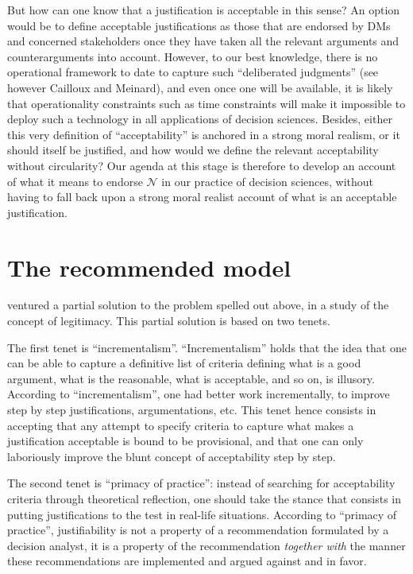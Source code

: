 \documentclass[preprint, french, english, 11pt, authoryear]{elsarticle}%
\newcommand{\adv}{\mathscr{N}}
\begin{document}
But how can one know that a justification is acceptable in this sense? An option would be to define acceptable justifications as those that are endorsed by \acp{DM} and concerned stakeholders once they have taken all the relevant arguments and counterarguments into account. However, to our best knowledge, there is no operational framework to date to capture such ``deliberated judgments'' (see however Cailloux and Meinard), and even once one will be available, it is likely that operationality constraints such as time constraints will make it impossible to deploy such a technology in all applications of decision sciences. Besides, either this very definition of ``acceptability'' is anchored in a strong moral realism, or it should itself be justified, and how would we define the relevant acceptability without circularity? Our agenda at this stage is therefore to develop an account of what it means to endorse $\adv$ in our practice of decision sciences, without having to fall back upon a strong moral realist account of what is an acceptable justification.

\section{The recommended model}
\cite{meinard_what_2017} ventured a partial solution to the problem spelled out above, in a study of the concept of legitimacy. This partial solution is based on two tenets.

The first tenet is ``incrementalism''. ``Incrementalism'' holds that the idea that one can be able to capture a definitive list of criteria defining what is a good argument, what is the reasonable, what is acceptable, and so on, is illusory. According to ``incrementalism'', one had better work incrementally, to improve step by step justifications, argumentations, etc. This tenet hence consists in accepting that any attempt to specify criteria to capture what makes a justification acceptable is bound to be provisional, and that one can only laboriously improve the blunt concept of acceptability step by step.

The second tenet is ``primacy of practice'': instead of searching for acceptability criteria through theoretical reflection, one should take the stance that consists in putting justifications to the test in real-life situations. According to ``primacy of practice'', justifiability is not a property of a recommendation formulated by a decision analyst, it is a property of the recommendation \emph{together with} the manner these recommendations are  implemented and argued against and in favor.
\end{document}
